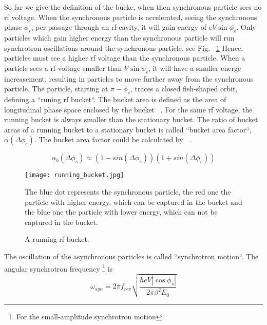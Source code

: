 So far we give the definition of the bucke, when then synchronous particle sees no rf voltage. When the synchronous particle is accelerated, seeing the synchronous phase $\phi_{\mathit{s}}$, per passage through an rf cavity, it will gain energy of $eV\sin\phi_{\mathit{s}}$. Only particles which gain higher energy than the synchronous particle will run synchrotron oscillations around the synchronous particle, see Fig. ~\ref{running_bucket} Hence, particles must see a higher rf voltage than the synchronous particle. When a particle sees a rf voltage smaller than $V\sin\phi_{\mathit{s}}$, it will have a smaller energe increasement, resulting in particles to move further away from the synchronous particle. The particle, starting at $\pi-\phi_{\mathit{s}}$, traces a closed fish-shaped orbit, defining a ``runing rf bucket``. The bucket area is defined as the area of longitudinal phase space enclosed by the bucket ~\cite{lee_accelerator_2011}. For the same rf voltage, the running
bucket is always smaller than the stationary bucket. The ratio of bucket areas of a running bucket to a stationary bucket is called ``bucket area factor``, $\alpha(\Delta \phi_s)$. The bucket area factor could be calculated by ~\cite{lee_accelerator_2011}.

\begin{equation}
\alpha_b(\Delta\phi_s)\approx(1-sin(\Delta \phi_s))(1+sin(\Delta \phi_s))
\label{eq:buckt_area_factor}
\end{equation} 

\begin{figure}[!htb]
   \centering   
   \texttt{[image: running\_bucket.jpg]}
   \caption{A running rf bucket.}{The blue dot represents the synchronous particle, the red one the particle with higher energy, which can be captured in the bucket and the blue one the particle with lower energy, which can not be captured in the bucket.}
   \label{running_bucket}
\end{figure} 

The oscillation of the asynchronous particles is called ``synchrotron motion``. The angular synchrotron frequency \footnote{For the small-amplitude synchrotron motion} is ~\cite{lee_accelerator_2011}
\begin{equation}
\omega_{\mathit{syn}}=2\pi f_{\mathit{rev}}\sqrt{\frac{heV|\cos\phi_s|}{2\pi\beta^2E_0}}
\label{eq:synchfreq}
\end{equation} 

